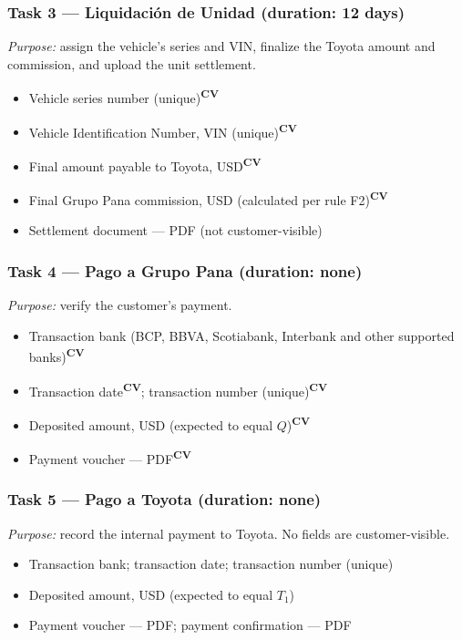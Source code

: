\documentclass[11pt,a4paper]{article}
\newcommand{\cv}{\textsuperscript{\textcolor{panablue}{\textbf{CV}}}}
\begin{document}
\subsubsection*{Task 3 --- Liquidación de Unidad (duration: 12 days)}
\textit{Purpose:} assign the vehicle's series and VIN, finalize the Toyota
amount and commission, and upload the unit settlement.
\begin{itemize}
	\item Vehicle series number (unique)\cv{}
	\item Vehicle Identification Number, VIN (unique)\cv{}
	\item Final amount payable to Toyota, USD\cv{}
	\item Final Grupo Pana commission, USD (calculated per rule F2)\cv{}
	\item Settlement document --- PDF (not customer-visible)
\end{itemize}

\subsubsection*{Task 4 --- Pago a Grupo Pana (duration: none)}
\textit{Purpose:} verify the customer's payment.
\begin{itemize}
	\item Transaction bank (BCP, BBVA, Scotiabank, Interbank and other supported banks)\cv{}
	\item Transaction date\cv{}; transaction number (unique)\cv{}
	\item Deposited amount, USD (expected to equal $Q$)\cv{}
	\item Payment voucher --- PDF\cv{}
\end{itemize}

\subsubsection*{Task 5 --- Pago a Toyota (duration: none)}
\textit{Purpose:} record the internal payment to Toyota. No fields are customer-visible.
\begin{itemize}
	\item Transaction bank; transaction date; transaction number (unique)
	\item Deposited amount, USD (expected to equal $T_1$)
	\item Payment voucher --- PDF; payment confirmation --- PDF
\end{itemize}
\end{document}
